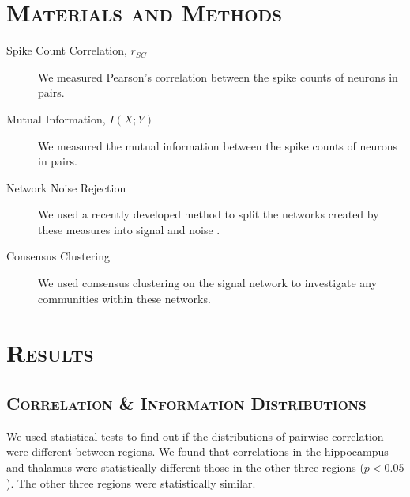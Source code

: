 \documentclass[a0,portrait]{a0poster}
\begin{document}
\begin{multicols}{2}


\section*{\color{NavyBlue}\textsc{Materials and Methods}\color{Black}}

\begin{description}
  \item[Spike Count Correlation, $r_{SC}$] We measured Pearson's correlation between the spike counts of neurons in pairs.
  \item[Mutual Information, $I(X;Y)$] We measured the mutual information between the spike counts of neurons in pairs.
  \item[Network Noise Rejection] We used a recently developed method to split the networks created by these measures into signal and noise \cite{humphries}.
  \item[Consensus Clustering] We used consensus clustering on the signal network to investigate any communities within these networks.
\end{description}


\section*{\color{NavyBlue}\textsc{Results}\color{Black}}

\subsection*{\color{NavyBlue}\textsc{Correlation \& Information Distributions}\color{Black}}

We used statistical tests to find out if the distributions of pairwise correlation were different between regions. We found that correlations in the hippocampus and thalamus were statistically different those in the other three regions ($p < 0.05$). The other three regions were statistically similar.


\end{multicols}
\end{document}
